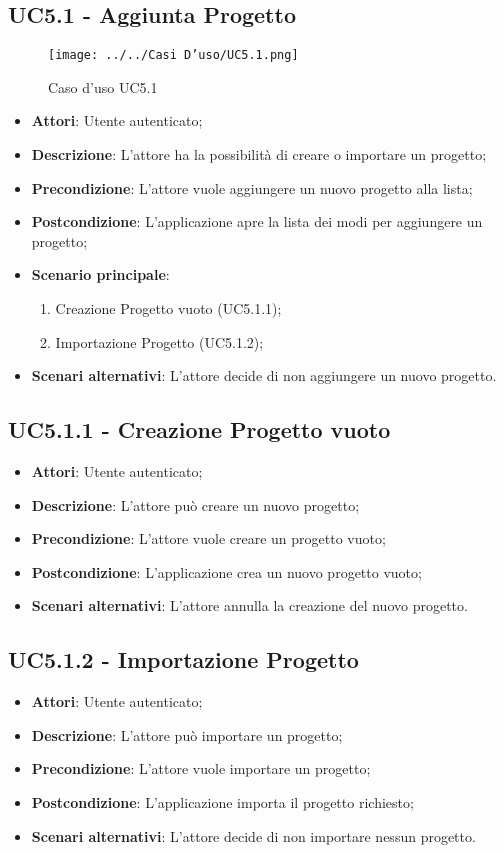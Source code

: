 \subsection{UC5.1 - Aggiunta Progetto} 
\label{ssec:UC5.1} 
\begin{figure}[h!] 
\centering 
\texttt{[image: ../../Casi D'uso/UC5.1.png]} 
\caption{Caso d'uso UC5.1} 
 \end{figure} 
\begin{itemize} 
\item \textbf{Attori}: Utente autenticato;
\item \textbf{Descrizione}: L’attore ha la possibilità di creare o importare un progetto;
\item \textbf{Precondizione}: L’attore vuole aggiungere un nuovo progetto alla lista;
\item \textbf{Postcondizione}: L’applicazione apre la lista dei modi per aggiungere un progetto;
\item \textbf{Scenario principale}: \begin{enumerate}\item Creazione Progetto vuoto (UC5.1.1);\item Importazione Progetto (UC5.1.2);
 \end{enumerate}
\item \textbf{Scenari alternativi}: L'attore decide di non aggiungere un nuovo progetto.
\end{itemize} 
\subsection{UC5.1.1 - Creazione Progetto vuoto} 
\label{ssec:UC5.1.1} 
\begin{itemize} 
\item \textbf{Attori}: Utente autenticato;
\item \textbf{Descrizione}: L'attore può creare un nuovo progetto;
\item \textbf{Precondizione}: L'attore vuole creare un progetto vuoto;
\item \textbf{Postcondizione}: L'applicazione crea un nuovo progetto vuoto;
\item \textbf{Scenari alternativi}: L'attore annulla la creazione del nuovo progetto.
\end{itemize} 
\newpage
\subsection{UC5.1.2 - Importazione Progetto} 
\label{ssec:UC5.1.2} 
\begin{itemize} 
\item \textbf{Attori}: Utente autenticato;
\item \textbf{Descrizione}: L'attore può importare un progetto;
\item \textbf{Precondizione}: L'attore vuole importare un progetto;
\item \textbf{Postcondizione}: L'applicazione importa il progetto richiesto;
\item \textbf{Scenari alternativi}: L'attore decide di non importare nessun progetto.
\end{itemize} 
